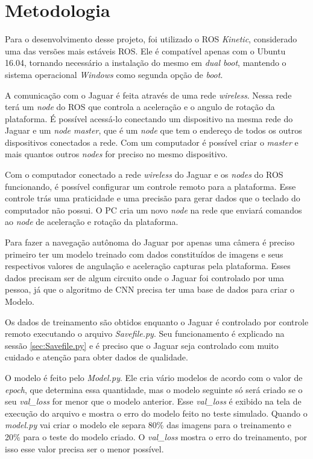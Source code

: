 \chapter{Metodologia}
\label{chap:metodologia}

Para o desenvolvimento desse projeto, foi utilizado o ROS \textit{Kinetic}, considerado uma das versões mais estáveis ROS. Ele é compatível apenas com o Ubuntu 16.04, tornando necessário a instalação do mesmo em \textit{dual boot}, mantendo o sistema operacional \textit{Windows} como segunda opção de \textit{boot}.

A comunicação com o Jaguar é feita através de uma rede \textit{wireless}. Nessa rede terá um \textit{node} do ROS que controla a aceleração e o angulo de rotação da plataforma. É possível acessá-lo conectando um dispositivo na mesma rede do Jaguar e um \textit{node master}, que é um \textit{node} que tem o endereço de todos os outros dispositivos conectados a rede. Com um computador é possível criar o \textit{master} e mais quantos outros \textit{nodes} for preciso no mesmo dispositivo.

Com o computador conectado a rede \textit{wireless} do Jaguar e os \textit{nodes} do ROS funcionando, é possível configurar um controle remoto para a plataforma. Esse controle trás uma praticidade e uma precisão para gerar dados que o teclado do computador não possui. O PC cria um novo \textit{node} na rede que enviará comandos ao \textit{node} de aceleração e rotação da plataforma. 

Para fazer a navegação autônoma do Jaguar por apenas uma câmera é preciso primeiro ter um modelo treinado com dados constituídos de imagens e seus respectivos valores de angulação e aceleração capturas pela plataforma. Esses dados precisam ser de algum circuito onde o Jaguar foi controlado por uma pessoa, já que o algoritmo de CNN precisa ter uma base de dados para criar o Modelo.

Os dados de treinamento são obtidos enquanto o Jaguar é controlado por controle remoto executando o arquivo \textit{Savefile.py}. Seu funcionamento é explicado na sessão \ref{sec:Savefile.py} e é preciso que o Jaguar seja controlado com muito cuidado e atenção para obter dados de qualidade.

O modelo é feito pelo \textit{Model.py}. Ele cria vário modelos de acordo com o valor de \textit{epoch}, que determina essa quantidade, mas o modelo seguinte só será criado se o seu \textit{val\_loss} for menor que o modelo anterior. Esse \textit{val\_loss} é exibido na tela de execução do arquivo e mostra o erro do modelo feito no teste simulado. Quando o \textit{model.py} vai criar o modelo ele separa 80\% das imagens para o treinamento e 20\% para o teste do modelo criado. O \textit{val\_loss} mostra o erro do treinamento, por isso esse valor precisa ser o menor possível.

